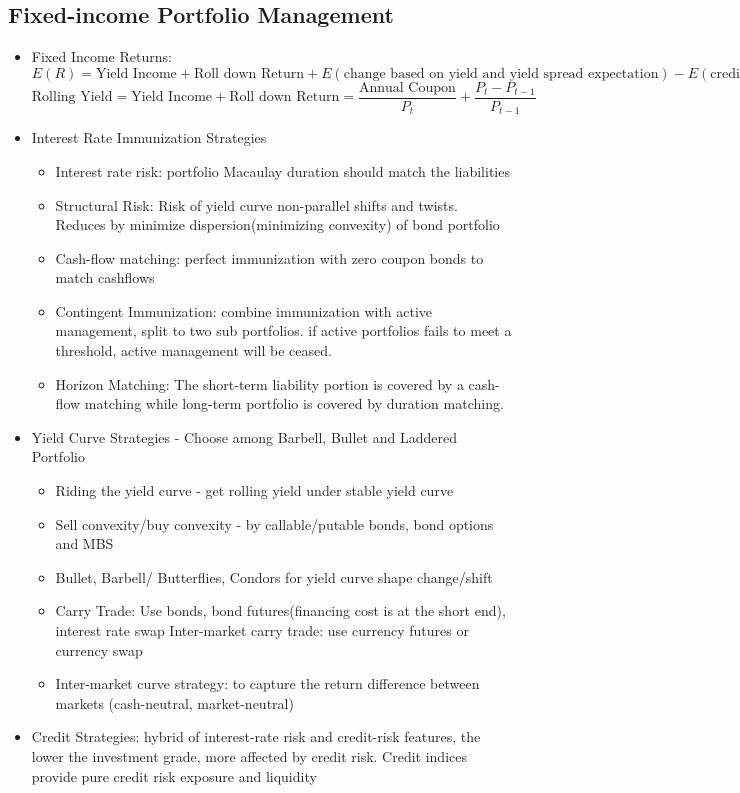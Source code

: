 \documentclass[11pt, openany]{book}              %
\begin{document}
\subsection{Fixed-income Portfolio Management}

\begin{itemize}
	\item Fixed Income Returns: $$E(R) = \text{Yield Income} + \text{Roll down Return}  + E(\text{change based on yield and yield spread expectation}) - E(\text{credit loss}) - E(\text{currency gain/loss})$$
		$$ \text{Rolling Yield} = \text{Yield Income} + \text{Roll down Return}  = \frac{\text{Annual Coupon}}{P_t} + \frac{P_t - P_{t-1}}{P_{t-1}}$$
	\item Interest Rate Immunization Strategies
	\begin{itemize}
		\item Interest rate risk: portfolio Macaulay duration should match the liabilities 
		\item Structural Risk: Risk of yield curve non-parallel shifts and twists. Reduces by minimize dispersion(minimizing convexity) of bond portfolio
		\item Cash-flow matching: perfect immunization with zero coupon bonds to match cashflows
		\item Contingent Immunization: combine immunization with active management, split to two sub portfolios. if active portfolios fails to meet a threshold, active management will be ceased.
		\item Horizon Matching: The short-term liability portion is covered by a cash-flow matching while long-term portfolio is covered by duration matching.
	\end{itemize}
	\item Yield Curve Strategies - Choose among Barbell, Bullet and Laddered Portfolio
	\begin{itemize}
		\item Riding the yield curve - get rolling yield under stable yield curve
		\item Sell convexity/buy convexity - by callable/putable bonds, bond options and MBS
		\item Bullet, Barbell/ Butterflies, Condors for yield curve shape change/shift
		\item Carry Trade: Use bonds, bond futures(financing cost is at the short end), interest rate swap
			\subitem Inter-market carry trade: use currency futures or currency swap
		\item Inter-market curve strategy: to capture the return difference between markets (cash-neutral, market-neutral)
	\end{itemize}
	\item Credit Strategies: hybrid of interest-rate risk and credit-risk features, the lower the investment grade, more affected by credit risk. Credit indices provide pure credit risk exposure and liquidity	
\end{itemize}
\end{document}
